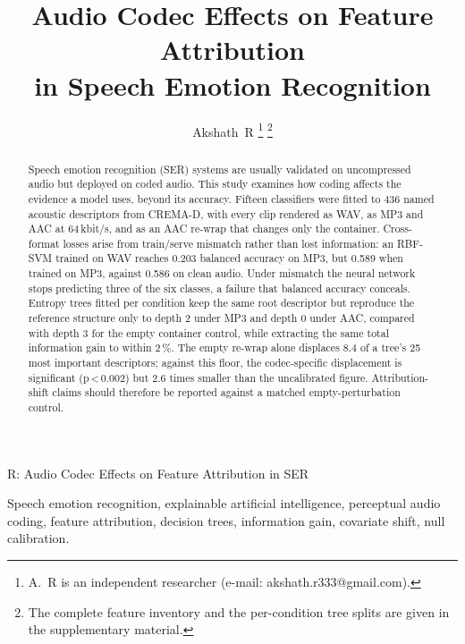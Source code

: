 \documentclass[lettersize,journal]{IEEEtran}
\begin{document}
\title{Audio Codec Effects on Feature Attribution\\
in Speech Emotion Recognition}

\author{Akshath~R%
\thanks{A.~R is an independent researcher (e-mail: akshath.r333@gmail.com).}%
\thanks{The complete feature inventory and the per-condition tree splits are
given in the supplementary material.}}

%
{R: Audio Codec Effects on Feature Attribution in SER}

\maketitle

\begin{abstract}
Speech emotion recognition (SER) systems are usually validated on uncompressed
audio but deployed on coded audio. This study examines how coding affects the
evidence a model uses, beyond its accuracy. Fifteen classifiers were fitted to
436 named acoustic descriptors from CREMA-D, with every clip rendered as WAV,
as MP3 and AAC at 64\,kbit/s, and as an AAC re-wrap that
changes only the container. Cross-format losses arise from train/serve
mismatch rather than lost information: an RBF-SVM trained on WAV reaches 0.203
balanced accuracy on MP3, but 0.589 when trained on MP3, against 0.586 on clean
audio. Under mismatch the neural network stops predicting three of the six
classes, a failure that balanced accuracy conceals. Entropy trees fitted per
condition keep the same root descriptor but reproduce the reference structure
only to depth 2 under MP3 and depth 0 under AAC, compared with depth 3 for the
empty container control, while extracting the same total information gain to
within 2\,\%. The empty re-wrap alone displaces 8.4 of a tree's 25 most
important descriptors; against this floor, the codec-specific displacement is
significant (p\,<\,0.002) but 2.6 times smaller than the
uncalibrated figure. Attribution-shift claims should therefore be reported
against a matched empty-perturbation control.
\end{abstract}

\begin{IEEEkeywords}
Speech emotion recognition, explainable artificial intelligence, perceptual
audio coding, feature attribution, decision trees, information gain, covariate
shift, null calibration.
\end{IEEEkeywords}
\end{document}
